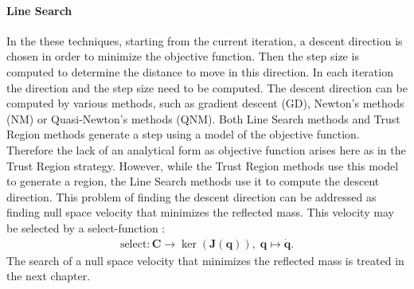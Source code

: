 \paragraph{Line Search}
\label{subsec:lsearch}



In the these techniques, starting from the current iteration, a descent direction is chosen in order to minimize the objective function. Then the step size is computed to determine the distance to move in this direction. In each iteration the direction and the step size need to be computed. The descent direction can be computed by various methods, such as gradient descent (GD), Newton's methods (NM) or Quasi-Newton's methods (QNM). %
Both Line Search methods and Trust Region methods generate a step using a model of the objective function. Therefore the lack of an analytical form as objective function arises here as in the Trust Region strategy.
However, while the Trust Region methods use this model to generate a region, the Line Search methods use it to compute the descent direction.  
This problem of finding the descent direction can be addressed as finding null space velocity that minimizes the reflected mass. This velocity may be selected by a  select-function :
%
\begin{align}
\text{select}: \mathbf{C}\rightarrow\ker(\mathbf{J}(\mathbf{q})),\; \mathbf{q}\mapsto\dot{\mathbf{q}} .
\end{align}
%
 The search of a null space velocity that minimizes the reflected mass is treated in the next chapter. 








